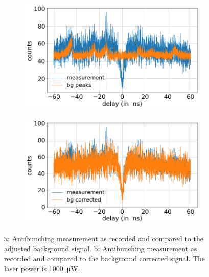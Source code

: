 \begin{figure}[H]
    \centering
    \begin{subfigure}{0.47\textwidth}
        \centering
        \includegraphics[width=1.0\textwidth]{img/output_t2/1000.0muW_bg_peaks.png}
    \caption{}
    \end{subfigure}
    \begin{subfigure}{0.47\textwidth}
        \centering
        \includegraphics[width=\textwidth]{img/output_t2/1000.0muW_bg_vgl.png}
        \caption{}
    \end{subfigure}
    \caption{a: Antibunching measurement as recorded and compared to the adjusted background signal. b: Antibunching measurement as recorded and compared to the background corrected signal. The laser power is \SI{1000}{\micro W}.} %
\end{figure}
